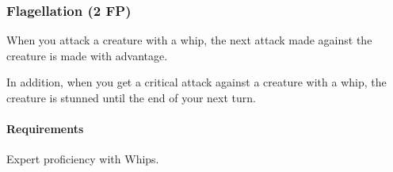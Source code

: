 \subsubsection{Flagellation (2 FP)} \label{feat::flagellation}
    When you attack a creature with a whip, the next attack made against the creature is made with advantage.

    In addition, when you get a critical attack against a creature with a whip, the creature is stunned until the end of your next turn.
    \paragraph{Requirements} Expert proficiency with Whips.

%
